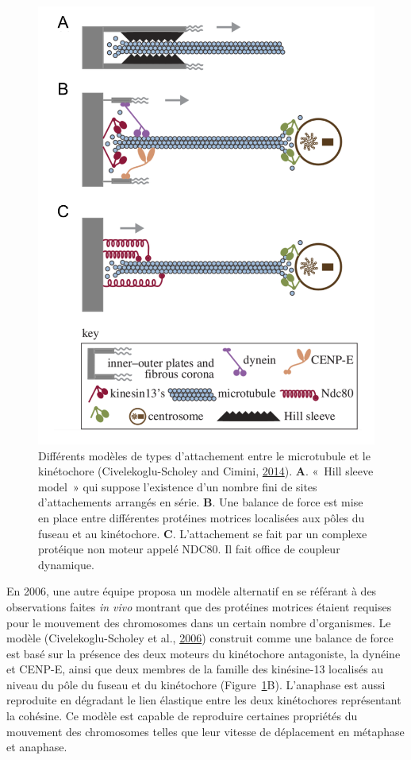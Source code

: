 \documentclass[12pt,a4paper,twoside,openright]{book}
\begin{document}
\begin{figure}[htbp]
\centering
\includegraphics{figures/intro/hill_model.png}
\caption{\label{fig:hill_model}Différents modèles de types d'attachement
entre le microtubule et le kinétochore (Civelekoglu-Scholey and Cimini,
\protect\hyperlink{ref-Civelekoglu-Scholey2014}{2014}). \textbf{A}.
«~Hill sleeve model~» qui suppose l'existence d'un nombre fini de sites
d'attachements arrangés en série. \textbf{B}. Une balance de force est
mise en place entre différentes protéines motrices localisées aux pôles
du fuseau et au kinétochore. \textbf{C}. L'attachement se fait par un
complexe protéique non moteur appelé NDC80. Il fait office de coupleur
dynamique.}
\end{figure}

En 2006, une autre équipe proposa un modèle alternatif en se référant à
des observations faites \emph{in vivo} montrant que des protéines
motrices étaient requises pour le mouvement des chromosomes dans un
certain nombre d'organismes. Le modèle (Civelekoglu-Scholey et al.,
\protect\hyperlink{ref-Civelekoglu-Scholey2006}{2006}) construit comme
une balance de force est basé sur la présence des deux moteurs du
kinétochore antagoniste, la dynéine et CENP-E, ainsi que deux membres de
la famille des kinésine-13 localisés au niveau du pôle du fuseau et du
kinétochore (Figure~\ref{fig:hill_model}B). L'anaphase est aussi
reproduite en dégradant le lien élastique entre les deux kinétochores
représentant la cohésine. Ce modèle est capable de reproduire certaines
propriétés du mouvement des chromosomes telles que leur vitesse de
déplacement en métaphase et anaphase.
\end{document}
